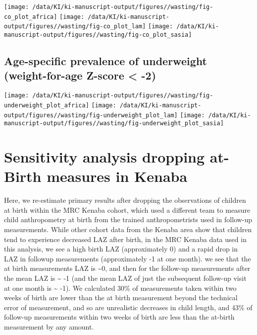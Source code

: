 \documentclass[
  9pt,
]{book}
\begin{document}
\texttt{[image: /data/KI/ki-manuscript-output/figures//wasting/fig-co\_plot\_africa]}
\texttt{[image: /data/KI/ki-manuscript-output/figures//wasting/fig-co\_plot\_lam]}
\texttt{[image: /data/KI/ki-manuscript-output/figures//wasting/fig-co\_plot\_sasia]}

\hypertarget{age-specific-prevalence-of-underweight-weight-for-age-z-score--2}{%
\section{Age-specific prevalence of underweight (weight-for-age Z-score \textless{} -2)}\label{age-specific-prevalence-of-underweight-weight-for-age-z-score--2}}

\texttt{[image: /data/KI/ki-manuscript-output/figures//wasting/fig-underweight\_plot\_africa]}
\texttt{[image: /data/KI/ki-manuscript-output/figures//wasting/fig-underweight\_plot\_lam]}
\texttt{[image: /data/KI/ki-manuscript-output/figures//wasting/fig-underweight\_plot\_sasia]}

\hypertarget{no-kenaba}{%
\chapter{Sensitivity analysis dropping at-Birth measures in Kenaba}\label{no-kenaba}}

\raggedright

Here, we re-estimate primary results after dropping the observations of children at birth within the MRC Kenaba cohort, which used a different team to measure child anthropometry at birth from the trained anthropometrists used in follow-up measurements. While other cohort data from the Kenaba area show that children tend to experience decreased LAZ after birth, in the MRC Kenaba data used in this analysis, we see a high birth LAZ (approximately 0) and a rapid drop in LAZ in followup measurements (approximately -1 at one month).
we see that the at birth measurements LAZ is \textasciitilde0, and then for the follow-up measurements after the mean LAZ is \textasciitilde{} -1 (and the mean LAZ of just the subsequent follow-up visit at one month is \textasciitilde{} -1). We calculated 30\% of measurements taken within two weeks of birth are lower than the at birth measurement beyond the technical error of measurement, and so are unrealistic decreases in child length, and 43\% of follow-up measurements within two weeks of birth are less than the at-birth measurement by any amount.
\end{document}

